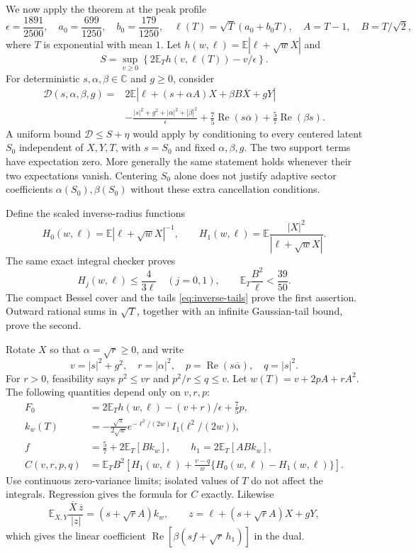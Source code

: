 We now apply the theorem at the peak profile
\[
 \epsilon=\frac{1891}{2500},\quad
 a_0=\frac{699}{1250},\quad b_0=\frac{179}{1250},\quad
 \ell(T)=\sqrt T(a_0+b_0T),\quad
 A=T-1,\quad B=T/\sqrt2,
\]
where $T$ is exponential with mean $1$.  Let
$h(w,\ell)=\mathbb E|\ell+\sqrt wX|$ and
\[
 S=\sup_{v\ge0}\left\{2\mathbb E_T h(v,\ell(T))-v/\epsilon\right\}.
\]
For deterministic $s,\alpha,\beta\in\mathbb C$ and $g\ge0$, consider
\begin{align}
 \mathcal D(s,\alpha,\beta,g)
 ={}&2\mathbb E|\ell+(s+\alpha A)X+\beta B\overline X+gY|\\
 &-\frac{|s|^2+g^2+|\alpha|^2+|\beta|^2}{\epsilon}
 +\frac75\operatorname{Re}(s\overline\alpha)
 +\frac57\operatorname{Re}(\beta s).
 \label{eq:centered-dual}
\end{align}
A uniform bound $\mathcal D\le S+\eta$ would apply by conditioning to
every centered latent $S_0$ independent of $X,Y,T$, with $s=S_0$ and
fixed $\alpha,\beta,g$.  The two support terms have expectation zero.
More generally the same statement holds whenever their two expectations
vanish.  Centering $S_0$ alone does not justify adaptive sector coefficients
$\alpha(S_0),\beta(S_0)$ without these extra cancellation conditions.

Define the scaled inverse-radius functions
\[
 H_0(w,\ell)=\mathbb E|\ell+\sqrt wX|^{-1},\qquad
 H_1(w,\ell)=\mathbb E\frac{|X|^2}{|\ell+\sqrt wX|}.
\]
The same exact integral checker proves
\begin{equation}
 H_j(w,\ell)\le\frac4{3\ell}\quad(j=0,1),
 \qquad \mathbb E_T\frac{B^2}{\ell}<\frac{39}{50}.
 \label{eq:B-price-integrals}
\end{equation}
The compact Bessel cover and the tails \eqref{eq:inverse-tails} prove the
first assertion.  Outward rational sums in $\sqrt T$, together with an
infinite Gaussian-tail bound, prove the second.

Rotate $X$ so that $\alpha=\sqrt r\ge0$, and write
\[
 v=|s|^2+g^2,\quad r=|\alpha|^2,\quad
 p=\operatorname{Re}(s\overline\alpha),\quad q=|s|^2.
\]
For $r>0$, feasibility says $p^2\le vr$ and $p^2/r\le q\le v$.
Let $w(T)=v+2pA+rA^2$.  The following quantities depend only on $v,r,p$:
\begin{align*}
 F_0&=2\mathbb E_T h(w,\ell)-(v+r)/\epsilon+\tfrac75p,\\
 k_w(T)&=-\frac{\sqrt\pi}{2\sqrt w}
           e^{-\ell^2/(2w)}I_1\bigl(\ell^2/(2w)\bigr),\\
 f&=\tfrac57+2\mathbb E_T[Bk_w],\qquad
 h_1=2\mathbb E_T[ABk_w],\\
 C(v,r,p,q)&=\mathbb E_T B^2\left[
 H_1(w,\ell)+\frac{v-q}{w}\{H_0(w,\ell)-H_1(w,\ell)\}\right].
\end{align*}
Use continuous zero-variance limits; isolated values of $T$ do not affect
the integrals.  Regression gives the formula for $C$ exactly.  Likewise
\[
 \mathbb E_{X,Y}\frac{\overline X\,\overline z}{|z|}
 =(s+\sqrt r A)k_w,
 \qquad z=\ell+(s+\sqrt r A)X+gY,
\]
which gives the linear coefficient
$\operatorname{Re}[\beta(sf+\sqrt r\,h_1)]$ in the dual.

